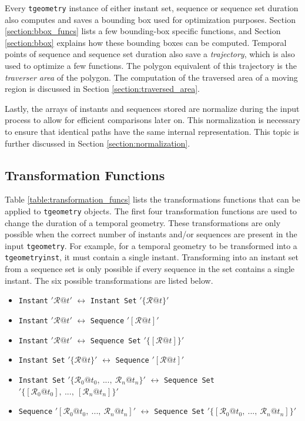 Every \lstinline+tgeometry+ instance of either instant set, sequence or sequence set duration also computes and saves a bounding box used for optimization purposes. Section \ref{section:bbox_funcs} lists a few bounding-box specific functions, and Section \ref{section:bbox} explains how these bounding boxes can be computed. Temporal points of sequence and sequence set duration also save a \textit{trajectory}, which is also used to optimize a few functions. The polygon equivalent of this trajectory is the \textit{traverser area} of the polygon. The computation of the traversed area of a moving region is discussed in Section \ref{section:traversed_area}.

Lastly, the arrays of instants and sequences stored are normalize during the input process to allow for efficient comparisons later on. This normalization is necessary to ensure that identical paths have the same internal representation. This topic is further discussed in Section \ref{section:normalization}.

\subsection{Transformation Functions}
\label{section:transformation_funcs}

Table \ref{table:transformation_funcs} lists the transformations functions that can be applied to \lstinline+tgeometry+ objects. The first four transformation functions are used to change the duration of a temporal geometry. These transformations are only possible when the correct number of instants and/or sequences are present in the input \lstinline+tgeometry+. For example, for a temporal geometry to be transformed into a \lstinline+tgeometryinst+, it must contain a single instant. Transforming into an instant set from a sequence set is only possible if every sequence in the set contains a single instant. The six possible transformations are listed below.

\begin{itemize}
    \item \lstinline+Instant+ $'\mathcal{R}@t'$ $\leftrightarrow$ \lstinline+Instant Set+ $'\{\mathcal{R}@t\}'$
    \item \lstinline+Instant+ $'\mathcal{R}@t'$ $\leftrightarrow$ \lstinline+Sequence+ $'[\mathcal{R}@t]'$
    \item \lstinline+Instant+ $'\mathcal{R}@t'$ $\leftrightarrow$ \lstinline+Sequence Set+ $'\{[\mathcal{R}@t]\}'$
    \item \lstinline+Instant Set+ $'\{\mathcal{R}@t\}'$ $\leftrightarrow$ \lstinline+Sequence+ $'[\mathcal{R}@t]'$
    \item \lstinline+Instant Set+ $'\{\mathcal{R}_0@t_0,\ ...,\ \mathcal{R}_n@t_n\}'$ $\leftrightarrow$ \lstinline+Sequence Set+ $'\{[\mathcal{R}_0@t_0],\ ...,\ [\mathcal{R}_n@t_n]\}'$
    \item \lstinline+Sequence+ $'[\mathcal{R}_0@t_0,\ ...,\ \mathcal{R}_n@t_n]'$ $\leftrightarrow$ \lstinline+Sequence Set+ $'\{[\mathcal{R}_0@t_0,\ ...,\ \mathcal{R}_n@t_n]\}'$
\end{itemize}

